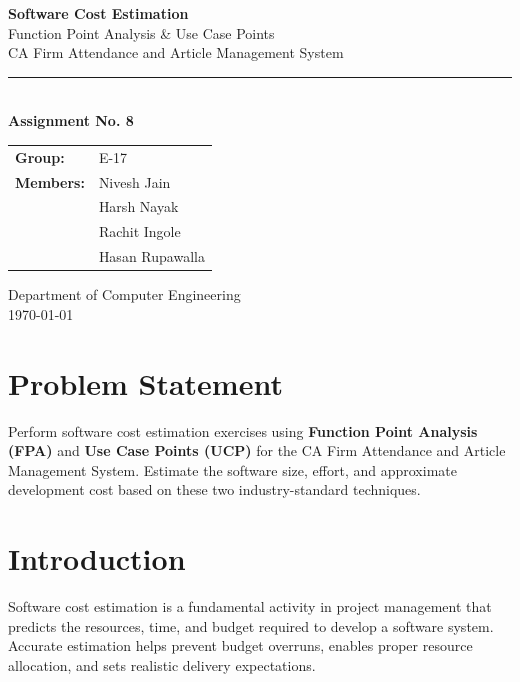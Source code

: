 \documentclass[12pt,a4paper]{article}
\begin{document}
\begin{titlepage}
\centering
\vspace*{2cm}
{\Huge\bfseries\color{headblue} Software Cost Estimation\\[12pt]}
{\LARGE Function Point Analysis \& Use Case Points\\[8pt]}
{\large CA Firm Attendance and Article Management System\\[20pt]}
\rule{0.6\textwidth}{1pt}\\[20pt]

{\large\textbf{Assignment No. 8}}\\[30pt]

\begin{tabular}{ll}
\textbf{Group:} & E-17 \\[4pt]
\textbf{Members:} & Nivesh Jain \\
 & Harsh Nayak \\
 & Rachit Ingole \\
 & Hasan Rupawalla \\
\end{tabular}

\vfill
{\small Department of Computer Engineering\\
\today}
\end{titlepage}

\section{Problem Statement}
Perform software cost estimation exercises using \textbf{Function Point Analysis (FPA)} and \textbf{Use Case Points (UCP)} for the CA Firm Attendance and Article Management System. Estimate the software size, effort, and approximate development cost based on these two industry-standard techniques.

\section{Introduction}
Software cost estimation is a fundamental activity in project management that predicts the resources, time, and budget required to develop a software system. Accurate estimation helps prevent budget overruns, enables proper resource allocation, and sets realistic delivery expectations.
\end{document}
